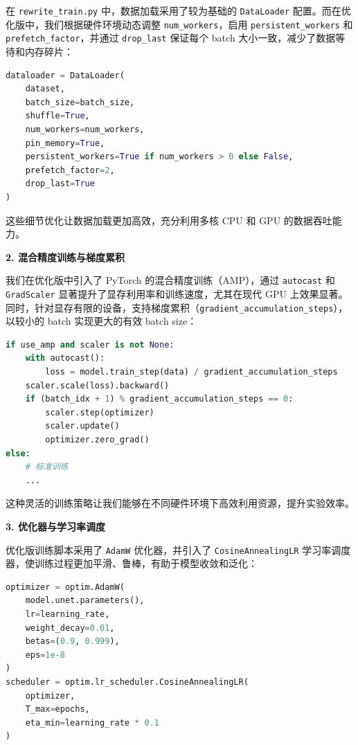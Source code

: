 \documentclass{ctexart}
\begin{document}
在 \texttt{rewrite\_train.py} 中，数据加载采用了较为基础的 \texttt{DataLoader} 配置。而在优化版中，我们根据硬件环境动态调整 \texttt{num\_workers}，启用 \texttt{persistent\_workers} 和 \texttt{prefetch\_factor}，并通过 \texttt{drop\_last} 保证每个 batch 大小一致，减少了数据等待和内存碎片：

\begin{lstlisting}[language=python]
dataloader = DataLoader(
    dataset,
    batch_size=batch_size,
    shuffle=True,
    num_workers=num_workers,
    pin_memory=True,
    persistent_workers=True if num_workers > 0 else False,
    prefetch_factor=2,
    drop_last=True
)
\end{lstlisting}

这些细节优化让数据加载更加高效，充分利用多核 CPU 和 GPU 的数据吞吐能力。

\vspace{0.5em}
\noindent
\textbf{2. 混合精度训练与梯度累积}

我们在优化版中引入了 PyTorch 的混合精度训练（AMP），通过 \texttt{autocast} 和 \texttt{GradScaler} 显著提升了显存利用率和训练速度，尤其在现代 GPU 上效果显著。同时，针对显存有限的设备，支持梯度累积（\texttt{gradient\_accumulation\_steps}），以较小的 batch 实现更大的有效 batch size：

\begin{lstlisting}[language=python]
if use_amp and scaler is not None:
    with autocast():
        loss = model.train_step(data) / gradient_accumulation_steps
    scaler.scale(loss).backward()
    if (batch_idx + 1) % gradient_accumulation_steps == 0:
        scaler.step(optimizer)
        scaler.update()
        optimizer.zero_grad()
else:
    # 标准训练
    ...
\end{lstlisting}

这种灵活的训练策略让我们能够在不同硬件环境下高效利用资源，提升实验效率。

\vspace{0.5em}
\noindent
\textbf{3. 优化器与学习率调度}

优化版训练脚本采用了 \texttt{AdamW} 优化器，并引入了 \texttt{CosineAnnealingLR} 学习率调度器，使训练过程更加平滑、鲁棒，有助于模型收敛和泛化：

\begin{lstlisting}[language=python]
optimizer = optim.AdamW(
    model.unet.parameters(), 
    lr=learning_rate,
    weight_decay=0.01,
    betas=(0.9, 0.999),
    eps=1e-8
)
scheduler = optim.lr_scheduler.CosineAnnealingLR(
    optimizer, 
    T_max=epochs,
    eta_min=learning_rate * 0.1
)
\end{lstlisting}
\end{document}
